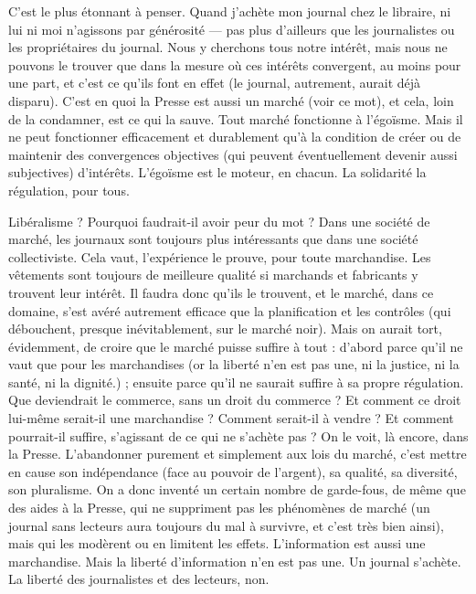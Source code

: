 C’est le plus étonnant à penser. Quand j'achète mon journal chez le
libraire, ni lui ni moi n’agissons par générosité — pas plus d’ailleurs que les journalistes
ou les propriétaires du journal. Nous y cherchons tous notre intérêt,
mais nous ne pouvons le trouver que dans la mesure où ces intérêts convergent,
au moins pour une part, et c’est ce qu’ils font en effet (le journal, autrement,
aurait déjà disparu). C’est en quoi la Presse est aussi un marché (voir ce mot),
et cela, loin de la condamner, est ce qui la sauve. Tout marché fonctionne à
l’égoïsme. Mais il ne peut fonctionner efficacement et durablement qu’à la
condition de créer ou de maintenir des convergences objectives (qui peuvent
éventuellement devenir aussi subjectives) d’intérêts. L'égoïsme est le moteur, en
chacun. La solidarité la régulation, pour tous.

Libéralisme ? Pourquoi faudrait-il avoir peur du mot ? Dans une société de
marché, les journaux sont toujours plus intéressants que dans une société collectiviste.
Cela vaut, l'expérience le prouve, pour toute marchandise. Les vêtements
sont toujours de meilleure qualité si marchands et fabricants y trouvent
leur intérêt. Il faudra donc qu’ils le trouvent, et le marché, dans ce domaine,
s’est avéré autrement efficace que la planification et les contrôles (qui débouchent,
presque inévitablement, sur le marché noir). Mais on aurait tort, évidemment,
de croire que le marché puisse suffire à tout : d’abord parce qu’il ne
vaut que pour les marchandises (or la liberté n’en est pas une, ni la justice, ni
la santé, ni la dignité.) ; ensuite parce qu’il ne saurait suffire à sa propre régulation.
Que deviendrait le commerce, sans un droit du commerce ? Et comment
ce droit lui-même serait-il une marchandise ? Comment serait-il à
vendre ? Et comment pourrait-il suffire, s’agissant de ce qui ne s’achète pas ?
On le voit, là encore, dans la Presse. L’abandonner purement et simplement
aux lois du marché, c’est mettre en cause son indépendance (face au pouvoir de
l'argent), sa qualité, sa diversité, son pluralisme. On a donc inventé un certain
nombre de garde-fous, de même que des aides à la Presse, qui ne suppriment
pas les phénomènes de marché (un journal sans lecteurs aura toujours du mal à
survivre, et c’est très bien ainsi), mais qui les modèrent ou en limitent les effets.
L'information est aussi une marchandise. Mais la liberté d’information n’en est
pas une. Un journal s’achète. La liberté des journalistes et des lecteurs, non.

